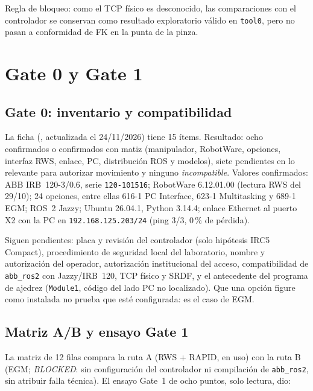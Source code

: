 \documentclass[10pt,a4paper]{article}
\DeclareRobustCommand{\ruta}[1]{\path{#1}}
\begin{document}
Regla de bloqueo: como el TCP físico es desconocido, las comparaciones con el controlador se conservan como resultado exploratorio válido en \texttt{tool0}, pero no pasan a conformidad de FK en la punta de la pinza.

\section{Gate 0 y Gate 1}
\label{sec:gates01}

\subsection{Gate 0: inventario y compatibilidad}
La ficha (\ruta{hito3/docs/gate0_ficha.md}, actualizada el 24/11/2026) tiene 15 ítems. Resultado: ocho confirmados o confirmados con matiz (manipulador, RobotWare, opciones, interfaz RWS, enlace, PC, distribución ROS y modelos), siete pendientes en lo relevante para autorizar movimiento y ninguno \textit{incompatible}. Valores confirmados: ABB IRB~120-3/0.6, serie \texttt{120-101516}; RobotWare 6.12.01.00 (lectura RWS del 29/10); 24 opciones, entre ellas 616-1 PC Interface, 623-1 Multitasking y 689-1 EGM; ROS~2 Jazzy; Ubuntu 26.04.1, Python 3.14.4; enlace Ethernet al puerto X2 con la PC en \texttt{192.168.125.203/24} (ping 3/3, 0\,\% de pérdida).

Siguen pendientes: placa y revisión del controlador (solo hipótesis IRC5 Compact), procedimiento de seguridad local del laboratorio, nombre y autorización del operador, autorización institucional del acceso, compatibilidad de \texttt{abb\_ros2} con Jazzy/IRB~120, TCP físico y SRDF, y el antecedente del programa de ajedrez (\texttt{Module1}, código del lado PC no localizado). Que una opción figure como instalada no prueba que esté configurada: es el caso de EGM.

\subsection{Matriz A/B y ensayo Gate 1}
La matriz de 12 filas compara la ruta A (RWS + RAPID, en uso) con la ruta B (EGM; \textit{BLOCKED}: sin configuración del controlador ni compilación de \texttt{abb\_ros2}, sin atribuir falla técnica). El ensayo Gate~1 de ocho puntos, solo lectura, dio:
\end{document}
